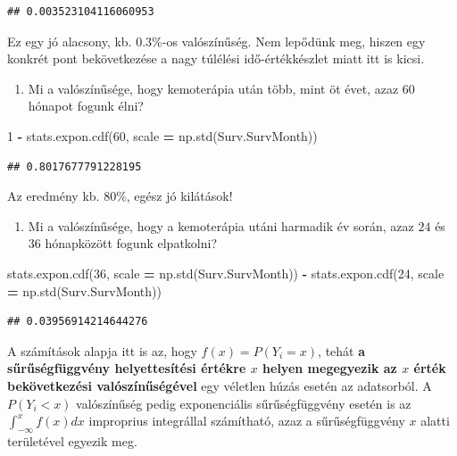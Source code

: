 \documentclass[
]{book}
\newenvironment{Shaded}{\begin{snugshade}}{\end{snugshade}}
\newcommand{\DecValTok}[1]{\textcolor[rgb]{0.00,0.00,0.81}{#1}}
\newcommand{\NormalTok}[1]{#1}
\newcommand{\OperatorTok}[1]{\textcolor[rgb]{0.81,0.36,0.00}{\textbf{#1}}}
\providecommand{\tightlist}{%
  \setlength{\itemsep}{0pt}\setlength{\parskip}{0pt}}
\begin{document}
\begin{verbatim}
## 0.003523104116060953
\end{verbatim}

Ez egy jó alacsony, kb. \(0.3\%\)-os valószínűség. Nem lepődünk meg, hiszen egy konkrét pont bekövetkezése a nagy túlélési idő-értékkészlet miatt itt is kicsi.

\begin{enumerate}
\def\labelenumi{\arabic{enumi}.}
\setcounter{enumi}{1}
\tightlist
\item
  Mi a valószínűsége, hogy kemoterápia után több, mint öt évet, azaz \(60\) hónapot fogunk élni?
\end{enumerate}

\begin{Shaded}
\begin{Highlighting}[]
\DecValTok{1} \OperatorTok{{-}}\NormalTok{ stats.expon.cdf(}\DecValTok{60}\NormalTok{, scale }\OperatorTok{=}\NormalTok{ np.std(Surv.SurvMonth))}
\end{Highlighting}
\end{Shaded}

\begin{verbatim}
## 0.8017677791228195
\end{verbatim}

Az eredmény kb. \(80\%\), egész jó kilátások!

\begin{enumerate}
\def\labelenumi{\arabic{enumi}.}
\setcounter{enumi}{2}
\tightlist
\item
  Mi a valószínűsége, hogy a kemoterápia utáni harmadik év során, azaz \(24\) és \(36\) hónapközött fogunk elpatkolni?
\end{enumerate}

\begin{Shaded}
\begin{Highlighting}[]
\NormalTok{stats.expon.cdf(}\DecValTok{36}\NormalTok{, scale }\OperatorTok{=}\NormalTok{ np.std(Surv.SurvMonth)) }\OperatorTok{{-}}\NormalTok{ stats.expon.cdf(}\DecValTok{24}\NormalTok{, scale }\OperatorTok{=}\NormalTok{ np.std(Surv.SurvMonth))}
\end{Highlighting}
\end{Shaded}

\begin{verbatim}
## 0.03956914214644276
\end{verbatim}

A számítások alapja itt is az, hogy \(f(x)=P(Y_i=x)\), tehát \textbf{a sűrűségfüggvény helyettesítési értékre \(x\) helyen megegyezik az \(x\) érték bekövetkezési valószínűségével} egy véletlen húzás esetén az adatsorból. A \(P(Y_i<x)\) valószínűség pedig exponenciális sűrűségfüggvény esetén is az \(\int_{-\infty}^x{f(x)}dx\) improprius integrállal számítható, azaz a sűrűségfüggvény \(x\) alatti területével egyezik meg.
\end{document}
